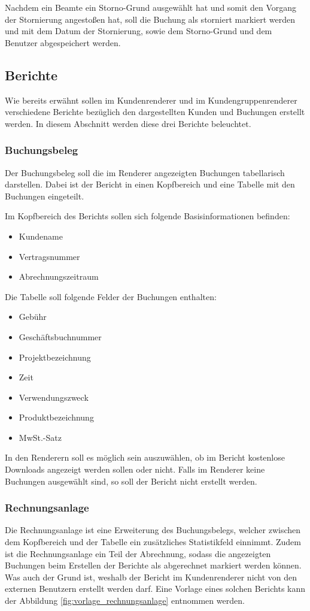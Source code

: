 Nachdem ein Beamte ein Storno-Grund ausgewählt hat und somit den Vorgang der Stornierung angestoßen hat, soll die Buchung als storniert markiert werden und mit dem Datum der Stornierung, sowie dem Storno-Grund und dem Benutzer abgespeichert werden.

\subsection{Berichte} \label{subsec:berichte}
Wie bereits erwähnt sollen im Kundenrenderer und im Kundengruppenrenderer verschiedene Berichte bezüglich den dargestellten Kunden und Buchungen erstellt werden. In diesem Abschnitt werden diese drei Berichte beleuchtet.

\subsubsection{Buchungsbeleg}
Der Buchungsbeleg soll die im Renderer angezeigten Buchungen tabellarisch darstellen.
Dabei ist der Bericht in einen Kopfbereich und eine Tabelle mit den Buchungen eingeteilt.

Im Kopfbereich des Berichts sollen sich folgende Basisinformationen befinden:
\begin{itemize}
  \item Kundename 
  \item Vertragsnummer
  \item Abrechnungszeitraum
\end{itemize}  
Die Tabelle soll folgende Felder der Buchungen enthalten:
\begin{itemize}
 \item Gebühr
 \item Geschäftsbuchnummer 
 \item Projektbezeichnung
 \item Zeit
 \item Verwendungszweck
 \item Produktbezeichnung
 \item MwSt.-Satz
\end{itemize}

In den Renderern soll es möglich sein auszuwählen, ob im Bericht kostenlose Downloads angezeigt werden sollen oder nicht.
Falls im Renderer keine Buchungen ausgewählt sind, so soll der Bericht nicht erstellt werden.

\subsubsection{Rechnungsanlage}
Die Rechnungsanlage ist eine Erweiterung des Buchungsbelegs, welcher zwischen dem Kopfbereich und der Tabelle ein zusätzliches Statistikfeld einnimmt.
Zudem ist die Rechnungsanlage ein Teil der Abrechnung, sodass die angezeigten Buchungen beim Erstellen der Berichte als abgerechnet markiert werden können.
Was auch der Grund ist, weshalb der Bericht im Kundenrenderer nicht von den externen Benutzern erstellt werden darf.
Eine Vorlage eines solchen Berichts kann der Abbildung \vref{fig:vorlage_rechnungsanlage} entnommen werden.


